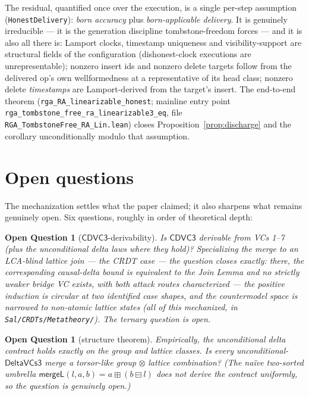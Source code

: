 \documentclass[11pt]{article}
\newtheorem{openq}[theorem]{Open Question}
\newcommand{\mergeL}{\mathsf{mergeL}}
\newcommand{\cd}{\mathsf{CDVC3}}
\newcommand{\lean}[1]{\texttt{#1}}
\begin{document}
The residual, quantified once over the execution, is a single per-step assumption
(\lean{HonestDelivery}): \emph{born accuracy} plus \emph{born-applicable delivery}. It is
genuinely irreducible --- it is the generation discipline tombstone-freedom forces --- and it
is also all there is: Lamport clocks, timestamp uniqueness and visibility-support are
structural fields of the configuration (dishonest-clock executions are unrepresentable);
nonzero insert ids and nonzero delete targets follow from the delivered op's own
wellformedness at a representative of its head class; nonzero delete \emph{timestamps} are
Lamport-derived from the target's insert. The end-to-end theorem
(\lean{rga\_RA\_linearizable\_honest}; mainline entry point
\lean{rga\_tombstone\_free\_ra\_linea\-rizable3\_eq},
file \lean{RGA\_TombstoneFree\_RA\_Lin.lean}) closes
Proposition~\ref{prop:discharge} and the corollary unconditionally modulo
that assumption.


\section{Open questions}
\label{sec:open}

The mechanization settles what the paper claimed; it also sharpens what
remains genuinely open. Six questions, roughly in order of theoretical
depth:

\begin{openq}[$\cd$-derivability]
\label{oq:cd}
Is $\cd$ derivable from VCs 1--7 (plus the unconditional delta laws where
they hold)? Specializing the merge to an LCA-blind lattice join --- the
CRDT case --- the question closes exactly: there, the corresponding
causal-delta bound is \emph{equivalent} to the Join Lemma and no strictly
weaker bridge VC exists, with both attack routes
characterized --- the positive induction is circular at two identified case
shapes, and the countermodel space is narrowed to non-atomic lattice
states (all of this mechanized, in \lean{Sal/CRDTs/Metatheory/}). The
ternary question is open.
\end{openq}

\begin{openq}[structure theorem]
Empirically, the \emph{unconditional} delta contract holds exactly on the
group and lattice classes. Is every unconditional-$\mathsf{DeltaVCs3}$
merge a torsor-like group$\,\otimes\,$lattice combination? (The na\"ive
two-sorted umbrella $\mergeL(l,a,b) = a \boxplus (b \boxminus l)$ does
\emph{not} derive the contract uniformly, so the question is genuinely
open.)
\end{openq}
\end{document}
